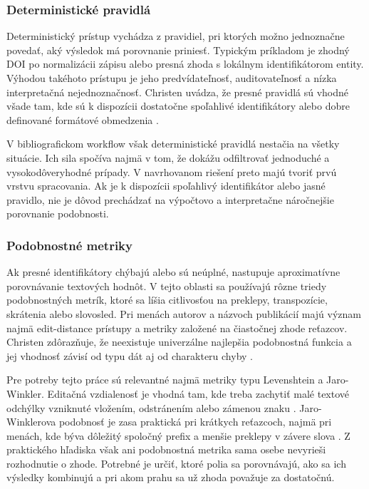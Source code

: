\subsubsection{Deterministické pravidlá}

Deterministický prístup vychádza z pravidiel, pri ktorých možno jednoznačne povedať, aký výsledok má porovnanie priniesť. Typickým príkladom je zhodný DOI po normalizácii zápisu alebo presná zhoda s lokálnym identifikátorom entity. Výhodou takéhoto prístupu je jeho predvídateľnosť, auditovateľnosť a nízka interpretačná nejednoznačnosť. Christen uvádza, že presné pravidlá sú vhodné všade tam, kde sú k dispozícii dostatočne spoľahlivé identifikátory alebo dobre definované formátové obmedzenia \cite{Christen2012}.

V bibliografickom workflow však deterministické pravidlá nestačia na všetky situácie. Ich sila spočíva najmä v tom, že dokážu odfiltrovať jednoduché a vysokodôveryhodné prípady. V navrhovanom riešení preto majú tvoriť prvú vrstvu spracovania. Ak je k dispozícii spoľahlivý identifikátor alebo jasné pravidlo, nie je dôvod prechádzať na výpočtovo a interpretačne náročnejšie porovnanie podobnosti.

\subsubsection{Podobnostné metriky}

Ak presné identifikátory chýbajú alebo sú neúplné, nastupuje aproximatívne porovnávanie textových hodnôt. V tejto oblasti sa používajú rôzne triedy podobnostných metrík, ktoré sa líšia citlivosťou na preklepy, transpozície, skrátenia alebo slovosled. Pri menách autorov a názvoch publikácií majú význam najmä edit-distance prístupy a metriky založené na čiastočnej zhode reťazcov. Christen zdôrazňuje, že neexistuje univerzálne najlepšia podobnostná funkcia a jej vhodnosť závisí od typu dát aj od charakteru chyby \cite{Christen2012}.

Pre potreby tejto práce sú relevantné najmä metriky typu Levenshtein a Jaro-Winkler. Editačná vzdialenosť je vhodná tam, kde treba zachytiť malé textové odchýlky vzniknuté vložením, odstránením alebo zámenou znaku \cite{Christen2012}. Jaro-Winklerova podobnosť je zasa praktická pri krátkych reťazcoch, najmä pri menách, kde býva dôležitý spoločný prefix a menšie preklepy v závere slova \cite{Winkler1990}. Z praktického hľadiska však ani podobnostná metrika sama osebe nevyrieši rozhodnutie o zhode. Potrebné je určiť, ktoré polia sa porovnávajú, ako sa ich výsledky kombinujú a pri akom prahu sa už zhoda považuje za dostatočnú.

